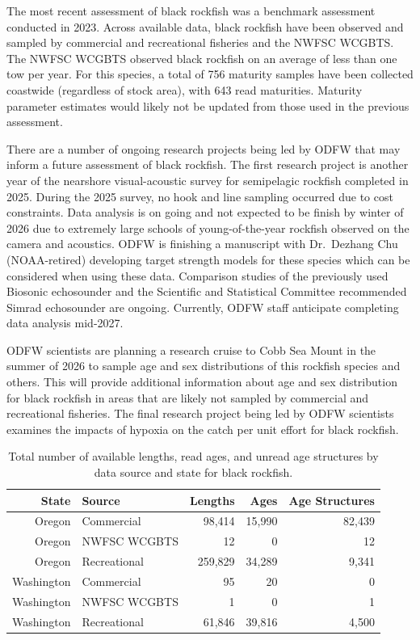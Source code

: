 \documentclass[
  english,
]{article}
\begin{document}
The most recent assessment of black rockfish was a benchmark assessment
conducted in 2023. Across available data, black rockfish have been
observed and sampled by commercial and recreational fisheries and the
NWFSC WCGBTS. The NWFSC WCGBTS observed black rockfish on an average of
less than one tow per year. For this species, a total of 756 maturity
samples have been collected coastwide (regardless of stock area), with
643 read maturities. Maturity parameter estimates would likely not be
updated from those used in the previous assessment.

There are a number of ongoing research projects being led by ODFW that
may inform a future assessment of black rockfish. The first research
project is another year of the nearshore visual-acoustic survey for
semipelagic rockfish completed in 2025. During the 2025 survey, no hook
and line sampling occurred due to cost constraints. Data analysis is on
going and not expected to be finish by winter of 2026 due to extremely
large schools of young-of-the-year rockfish observed on the camera and
acoustics. ODFW is finishing a manuscript with Dr.~Dezhang Chu
(NOAA-retired) developing target strength models for these species which
can be considered when using these data. Comparison studies of the
previously used Biosonic echosounder and the Scientific and Statistical
Committee recommended Simrad echosounder are ongoing. Currently, ODFW
staff anticipate completing data analysis mid-2027.

ODFW scientists are planning a research cruise to Cobb Sea Mount in the
summer of 2026 to sample age and sex distributions of this rockfish
species and others. This will provide additional information about age
and sex distribution for black rockfish in areas that are likely not
sampled by commercial and recreational fisheries. The final research
project being led by ODFW scientists examines the impacts of hypoxia on
the catch per unit effort for black rockfish.

\begingroup
\fontsize{9.0pt}{11.0pt}\selectfont
\begin{longtable}{r>{\raggedleft\arraybackslash}p{\dimexpr 105.00pt -2\tabcolsep-1.5\arrayrulewidth}rrr}
\caption{Total number of available lengths, read ages, and unread age structures
by data source and state for black rockfish.}\tabularnewline

\toprule
State & Source & Lengths & Ages & Age Structures \\ 
\midrule\addlinespace[2.5pt]
Oregon & Commercial & 98,414 & 15,990 & 82,439 \\ 
Oregon & NWFSC WCGBTS & 12 & 0 & 12 \\ 
Oregon & Recreational & 259,829 & 34,289 & 9,341 \\ 
Washington & Commercial & 95 & 20 & 0 \\ 
Washington & NWFSC WCGBTS & 1 & 0 & 1 \\ 
Washington & Recreational & 61,846 & 39,816 & 4,500 \\ 
\bottomrule
\end{longtable}
\endgroup
\end{document}
